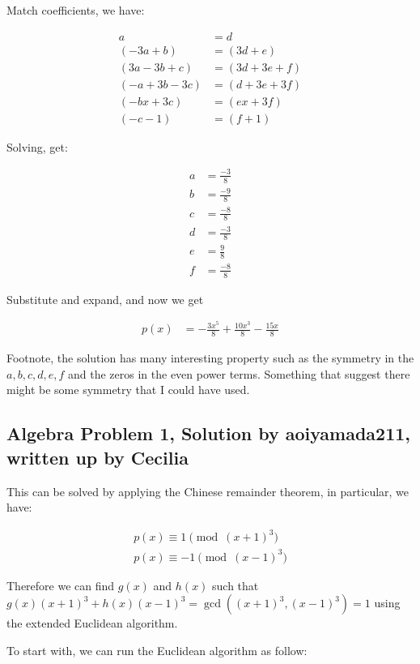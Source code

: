 \documentclass{article}
\begin{document}
Match coefficients, we have:

\begin{align*}
               a &= d             \\
       (-3a + b) &=  (3d + e)     \\
   (3a - 3b + c) &= (3d + 3e + f) \\
  (-a + 3b - 3c) &= (d + 3e + 3f) \\
      (-bx + 3c) &= (ex + 3f)     \\
        (-c - 1) &= (f + 1)
\end{align*}

Solving, get:

\begin{align*}
  a &= \frac{-3}{8} \\
  b &= \frac{-9}{8} \\
  c &= \frac{-8}{8} \\
  d &= \frac{-3}{8} \\
  e &= \frac{ 9}{8} \\
  f &= \frac{-8}{8}
\end{align*}

Substitute and expand, and now we get

\begin{align*}
  p(x) &= -\frac{3x^5}{8} + \frac{10x^3}{8} - \frac{15x}{8}
\end{align*}

Footnote, the solution has many interesting property such as the symmetry in the $ a, b, c, d, e, f $ and the zeros in the even power terms. Something that suggest there might be some symmetry that I could have used.

\subsection*{Algebra Problem 1, Solution by aoiyamada211, written up by Cecilia}
This can be solved by applying the Chinese remainder theorem, in particular, we have:

\begin{align*}
  p(x) \equiv 1 \pmod{(x+1)^3} \\
  p(x) \equiv -1 \pmod{(x-1)^3}
\end{align*}

Therefore we can find $ g(x) $ and $ h(x) $ such that $ g(x)(x+1)^3 + h(x)(x-1)^3 = \gcd((x+1)^3, (x-1)^3) = 1 $ using the extended Euclidean algorithm.

To start with, we can run the Euclidean algorithm as follow:
\end{document}
